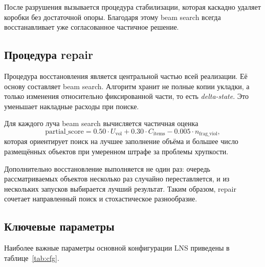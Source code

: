 \documentclass[12pt,a4paper]{article}
\begin{document}
После разрушения вызывается процедура стабилизации, которая каскадно удаляет коробки без достаточной опоры. Благодаря этому beam search всегда восстанавливает уже согласованное частичное решение.

\subsection{Процедура repair}

Процедура восстановления является центральной частью всей реализации. Её основу составляет beam search. Алгоритм хранит не полные копии укладки, а только изменения относительно фиксированной части, то есть \textit{delta-state}. Это уменьшает накладные расходы при поиске.

Для каждого луча beam search вычисляется частичная оценка
\[
\text{partial\_score} =
0.50 \cdot U_{\text{vol}} +
0.30 \cdot C_{\text{items}} -
0.005 \cdot n_{\text{frag\_viol}},
\]
которая ориентирует поиск на лучшее заполнение объёма и большее число размещённых объектов при умеренном штрафе за проблемы хрупкости.

Дополнительно восстановление выполняется не один раз: очередь рассматриваемых объектов несколько раз случайно переставляется, и из нескольких запусков выбирается лучший результат. Таким образом, repair сочетает направленный поиск и стохастическое разнообразие.

\subsection{Ключевые параметры}

Наиболее важные параметры основной конфигурации LNS приведены в таблице~\ref{tab:cfg}.
\end{document}
